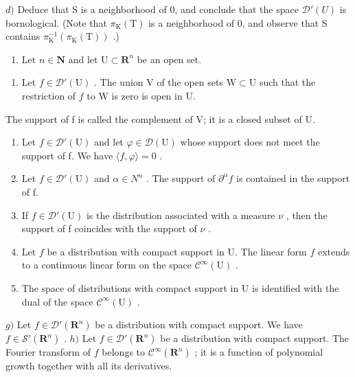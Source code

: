 \(d)\) Deduce that S is a neighborhood of 0, and conclude that the space \(\mathcal{D}'(U)\) is bornological. (Note that \(\pi_{\mathrm{K}}(\mathrm{T})\) is a neighborhood of 0, and observe that S contains \(\pi_{\mathrm{K}}^{-1}(\pi_{\mathrm{K}}(\mathrm{T}))\) .)

\begin{enumerate}
\def\labelenumi{\arabic{enumi})}
\setcounter{enumi}{18}
\tightlist
\item
  Let \(n \in \mathbf{N}\) and let \(\mathrm{U} \subset \mathbf{R}^n\) be an open set.
\end{enumerate}

\begin{enumerate}
\def\labelenumi{\alph{enumi})}
\tightlist
\item
  Let \(f \in \mathcal{D}'(\mathrm{U})\) . The union V of the open sets \(\mathrm{W} \subset \mathrm{U}\) such that the restriction of \(f\) to W is zero is open in U.
\end{enumerate}

The support of f is called the complement of V; it is a closed subset of U.

\begin{enumerate}
\def\labelenumi{\alph{enumi})}
\setcounter{enumi}{1}
\item
  Let \(f \in \mathcal{D}'(\mathrm{U})\) and let \(\varphi \in \mathcal{D}(\mathrm{U})\) whose support does not meet the support of f. We have \(\langle f, \varphi \rangle = 0\) .
\item
  Let \(f \in \mathcal{D}'(\mathrm{U})\) and \(\alpha \in N^{n}\) . The support of \(\partial^{\alpha}f\) is contained in the support of f.
\item
  If \(f \in \mathcal{D}'(\mathrm{U})\) is the distribution associated with a measure \(\nu\) , then the support of f coincides with the support of \(\nu\) .
\item
  Let \(f\) be a distribution with compact support in U. The linear form \(f\) extends to a continuous linear form on the space \(\mathcal{C}^{\infty}(\mathrm{U})\) .
\item
  The space of distributions with compact support in U is identified with the dual of the space \(\mathcal{C}^{\infty}(\mathrm{U})\) .
\end{enumerate}

\(g)\) Let \(f \in \mathcal{D}'(\mathbf{R}^n)\) be a distribution with compact support. We have \(f \in \mathcal{S}'(\mathbf{R}^n)\) . \(h)\) Let \(f \in \mathcal{D}'(\mathbf{R}^n)\) be a distribution with compact support. The Fourier transform of \(f\) belongs to \(\mathcal{C}^\infty(\mathbf{R}^n)\) ; it is a function of polynomial growth together with all its derivatives.

